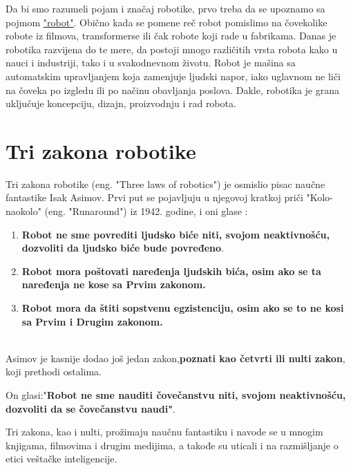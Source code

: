 \documentclass{report}
\begin{document}
	
	
	Da bi smo razumeli pojam i značaj robotike, prvo treba da se upoznamo sa pojmom \href{https://www.sciencefriday.com/segments/the-origin-of-the-word-robot/}{"robot"}.
	Obično kada se pomene reč robot pomislimo na čovekolike robote iz filmova, transformerse ili čak robote koji rade u fabrikama. Danas je robotika razvijena do te mere, da postoji mnogo različitih vrsta robota kako u nauci i industriji, tako i u svakodnevnom životu. Robot je mašina sa automatskim upravljanjem koja zamenjuje ljudski napor, iako uglavnom ne liči na čoveka po izgledu ili po načinu obavljanja poslova. Dakle, robotika je grana uključuje koncepciju, dizajn, proizvodnju i rad robota. \cite{robots in nowdays}
	
	\section{Tri zakona robotike}
	Tri zakona robotike (eng. "Three laws of robotics") je osmislio pisac naučne fantastike Isak Asimov. Prvi put se pojavljuju u njegovoj kratkoj priči "Kolo-naokolo" (eng. "Runaround") iz 1942. godine, i oni glase \cite{three laws of robotics, runaround}:
	\begin{enumerate}
	\item \textbf{Robot ne sme povrediti ljudsko biće niti, svojom neaktivnošću, dozvoliti da ljudsko biće bude povređeno}.
	
	\item \textbf{Robot mora poštovati naređenja ljudskih bića, osim ako se ta naređenja ne kose sa Prvim zakonom.}
	
	\item \textbf{Robot mora da štiti sopstvenu egzistenciju, osim ako se to ne kosi sa Prvim i Drugim zakonom.}
	\end{enumerate}\\
	
	Asimov je kasnije dodao još jedan zakon,\textbf{poznati kao četvrti ili nulti zakon}, koji prethodi ostalima.\par
	
	On glasi:"\textbf{Robot ne sme nauditi čovečanstvu niti, svojom neaktivnošću, dozvoliti da se čovečanstvu naudi"}.\par
	Tri zakona, kao i nulti, prožimaju naučnu fantastiku i navode se u mnogim knjigama, filmovima i drugim medijima, a takođe su uticali i na razmišljanje o etici veštačke inteligencije.\cite{three laws of robotics}
	
	
	
\end{document}
